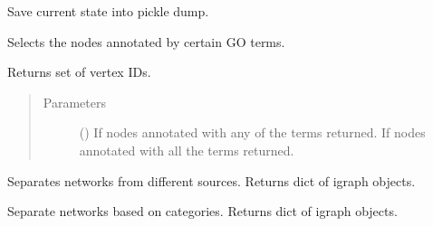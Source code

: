 \documentclass[letterpaper,10pt,english]{sphinxmanual}
\begin{document}
\begin{fulllineitems}

\begin{fulllineitems}
\label{\detokenize{main:pypath.main.PyPath.save_session}}
Save current state into pickle dump.

\end{fulllineitems}


\begin{fulllineitems}
\label{\detokenize{main:pypath.main.PyPath.select_by_go}}
Selects the nodes annotated by certain GO terms.

Returns set of vertex IDs.
\begin{quote}\begin{description}
\item[{Parameters}] \leavevmode
{} () \textendash{} If  nodes annotated with any of the terms returned.
If  nodes annotated with all the terms returned.

\end{description}\end{quote}

\end{fulllineitems}


\begin{fulllineitems}
\label{\detokenize{main:pypath.main.PyPath.separate}}
Separates networks from different sources.
Returns dict of igraph objects.

\end{fulllineitems}


\begin{fulllineitems}
\label{\detokenize{main:pypath.main.PyPath.separate_by_category}}
Separate networks based on categories.
Returns dict of igraph objects.


\end{fulllineitems}
\end{fulllineitems}
\end{document}
